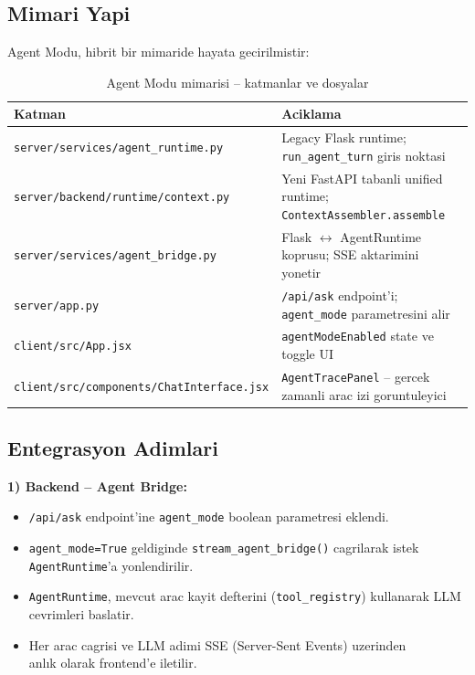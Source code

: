 \documentclass[11pt,a4paper]{article}
\begin{document}
{\subsection{Mimari Yapi}

Agent Modu, hibrit bir mimaride hayata gecirilmistir:

\begin{table}[h]
\centering
\begin{tabularx}{\textwidth}{@{}lX@{}}
\toprule
Katman & Aciklama \\
\midrule
\texttt{server/services/agent\_runtime.py} & Legacy Flask runtime; \texttt{run\_agent\_turn} giris noktasi \\
\texttt{server/backend/runtime/context.py} & Yeni FastAPI tabanli unified runtime; \texttt{ContextAssembler.assemble} \\
\texttt{server/services/agent\_bridge.py} & Flask $\leftrightarrow$ AgentRuntime koprusu; SSE aktarimini yonetir \\
\texttt{server/app.py} & \texttt{/api/ask} endpoint'i; \texttt{agent\_mode} parametresini alir \\
\texttt{client/src/App.jsx} & \texttt{agentModeEnabled} state ve toggle UI \\
\texttt{client/src/components/ChatInterface.jsx} & \texttt{AgentTracePanel} -- gercek zamanli arac izi goruntuleyici \\
\bottomrule
\end{tabularx}
\caption{Agent Modu mimarisi -- katmanlar ve dosyalar}
\end{table}

\subsection{Entegrasyon Adimlari}

\textbf{1) Backend -- Agent Bridge:}
\begin{itemize}[leftmargin=1.5em]
    \item \texttt{/api/ask} endpoint'ine \texttt{agent\_mode} boolean parametresi eklendi.
    \item \texttt{agent\_mode=True} geldiginde \texttt{stream\_agent\_bridge()} cagrilarak istek \texttt{AgentRuntime}'a yonlendirilir.
    \item \texttt{AgentRuntime}, mevcut arac kayit defterini (\texttt{tool\_registry}) kullanarak LLM cevrimleri baslatir.
    \item Her arac cagrisi ve LLM adimi SSE (Server-Sent Events) uzerinden \\ anlık olarak frontend'e iletilir.
\end{itemize}

}
\end{document}
